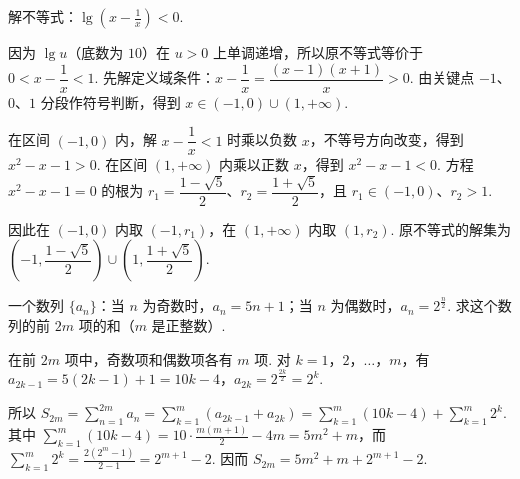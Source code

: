 \begin{problem}
解不等式：\(\lg\left(x-\frac{1}{x}\right) < 0\).
\end{problem}

\begin{solution}
因为 \(\lg u\)（底数为 \(10\)）在 \(u>0\) 上单调递增，所以原不等式等价于 \(0<x-\dfrac1x<1\). 先解定义域条件：\(x-\dfrac1x=\dfrac{(x-1)(x+1)}x>0\). 由关键点 \(-1\)、\(0\)、\(1\) 分段作符号判断，得到 \(x\in(-1,0)\cup(1,+\infty)\).

在区间 \((-1,0)\) 内，解 \(x-\dfrac1x<1\) 时乘以负数 \(x\)，不等号方向改变，得到 \(x^2-x-1>0\). 在区间 \((1,+\infty)\) 内乘以正数 \(x\)，得到 \(x^2-x-1<0\). 方程 \(x^2-x-1=0\) 的根为 \(r_1=\dfrac{1-\sqrt5}{2}\)、\(r_2=\dfrac{1+\sqrt5}{2}\)，且 \(r_1\in(-1,0)\)、\(r_2>1\).

因此在 \((-1,0)\) 内取 \((-1,r_1)\)，在 \((1,+\infty)\) 内取 \((1,r_2)\). 原不等式的解集为 \(\left(-1,\dfrac{1-\sqrt5}{2}\right)\cup\left(1,\dfrac{1+\sqrt5}{2}\right)\).
\end{solution}

\begin{problem}
一个数列 \(\{a_n\}\)：当 \(n\) 为奇数时，\(a_n = 5n + 1\)；当 \(n\) 为偶数时，\(a_n = 2^{\frac n2}\). 求这个数列的前 \(2m\) 项的和（\(m\) 是正整数）.
\end{problem}

\begin{solution}
在前 \(2m\) 项中，奇数项和偶数项各有 \(m\) 项. 对 \(k=1\)，\(2\)，\(\ldots\)，\(m\)，有 \(a_{2k-1}=5(2k-1)+1=10k-4\)，\(a_{2k}=2^{\frac{2k}{2}}=2^k\).

所以 \(\displaystyle S_{2m}=\sum_{n=1}^{2m}a_n=\sum_{k=1}^m\left(a_{2k-1}+a_{2k}\right)=\sum_{k=1}^m(10k-4)+\sum_{k=1}^m2^k\). 其中 \(\displaystyle\sum_{k=1}^m(10k-4)=10\cdot\frac{m(m+1)}2-4m=5m^2+m\)，而 \(\displaystyle\sum_{k=1}^m2^k=\frac{2(2^m-1)}{2-1}=2^{m+1}-2\). 因而 \(\displaystyle S_{2m}=5m^2+m+2^{m+1}-2\).
\end{solution}
